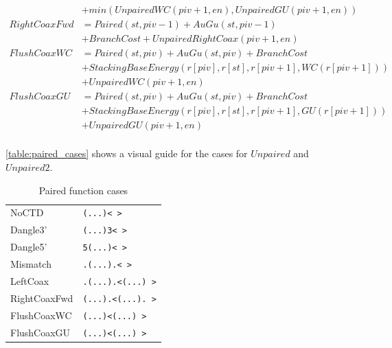 \documentclass{cshonours}
\begin{document}
\begin{align*}
  & + min(UnpairedWC(piv + 1, en), UnpairedGU(piv + 1, en)) \\
RightCoaxFwd &= Paired(st, piv - 1) + AuGu(st, piv - 1) \\
  & + BranchCost + UnpairedRightCoax(piv + 1, en) \\
FlushCoaxWC &= Paired(st, piv) + AuGu(st, piv) + BranchCost \\
  & + StackingBaseEnergy(r[piv], r[st], r[piv + 1], WC(r[piv + 1])) \\
  & + UnpairedWC(piv + 1, en) \\
FlushCoaxGU &= Paired(st, piv) + AuGu(st, piv) + BranchCost \\
  & + StackingBaseEnergy(r[piv], r[st], r[piv + 1], GU(r[piv + 1])) \\
  & + UnpairedGU(piv + 1, en) \\
\end{align*}

\autoref{table:paired_cases} shows a visual guide for the cases for $Unpaired$ and $Unpaired2$.

\begin{table}[h]
\begin{adjustbox}{center}
\begin{tabular}{ll}
NoCTD & \texttt{(...)<   >} \\
Dangle3' & \texttt{(...)3<   >} \\
Dangle5' & \texttt{5(...)<   >} \\
Mismatch & \texttt{.(...).<   >} \\
LeftCoax & \texttt{.(...).<(...) >} \\
RightCoaxFwd & \texttt{(...).<(...). >} \\
FlushCoaxWC & \texttt{(...)<(...) >} \\
FlushCoaxGU & \texttt{(...)<(...) >} \\
\end{tabular}
\end{adjustbox}
\caption{Paired function cases}
\label{table:unpaired_cases}
\end{table}
\end{document}
